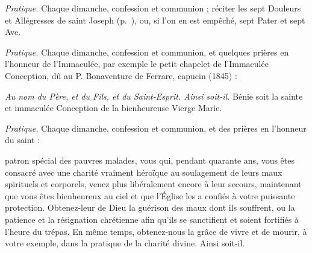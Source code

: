 \documentclass{bibliotheca-missel}
\begin{document}
\begin{notice}\textit{Pratique.} Chaque dimanche, confession et communion ; réciter les sept Douleurs et Allégresses de saint Joseph (p.~\pageref{joseph}), ou, si l’on en est empêché, sept Pater et sept Ave.\end{notice}

\begin{notice}\textit{Pratique.} Chaque dimanche, confession et communion, et quelques prières en l’honneur de l’Immaculée, par exemple le petit chapelet de l’Immaculée Conception, dû au P. Bonaventure de Ferrare, capucin (1845) :\end{notice}
\priere\textit{Au nom du Père, et du Fils, et du Saint-Esprit. Ainsi soit-il.}
\priere Bénie soit la sainte et immaculée Conception de la bienheureuse Vierge Marie.

\begin{notice}\textit{Pratique.} Chaque dimanche, confession et communion, et des prières en l’honneur du saint :\end{notice}
 patron spécial des pauvres malades, vous qui, pendant quarante ans, vous êtes consacré avec une charité vraiment héroïque au soulagement de leurs maux spirituels et corporels, venez plus libéralement encore à leur secours, maintenant que vous êtes bienheureux au ciel et que l’Église les a confiés à votre puissante protection. Obtenez-leur de Dieu la guérison des maux dont ils souffrent, ou la patience et la résignation chrétienne afin qu’ils se sanctifient et soient fortifiés à l’heure du trépas. En même temps, obtenez-nous la grâce de vivre et de mourir, à votre exemple, dans la pratique de la charité divine. Ainsi soit-il.
\end{document}
